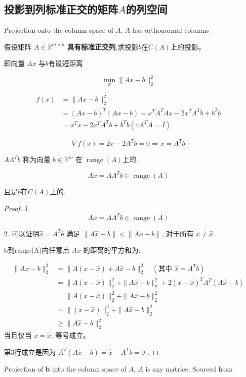 \subsection{投影到列标准正交的矩阵$A$的列空间}
\label{chap:projection-onto-a}


\begin{FigureCenter}{Projection onto the column space of $A$, $A$ has orthonormal columns}
    

\end{FigureCenter}


\begin{problem}
    假设矩阵 $ A \in \mathbb{R}^{m \times n} $ \textbf{具有标准正交列},求投影$b$在$C(A)$上的投影。
\end{problem}

即向量 $ A x $ 与$b$有最短距离

$$
\min _{x}\|A x-b\|_{2}^{2}
$$

$$ \begin{aligned} f(x) &=\|A x-b\|_{2}^{2}
    \\ & =(A x-b)^{T}(A x-b)=x^{T} A^{T} A x-2 x^{T} A^{T} b+b^{T} b \\ &=x^{T} x-2 x^{T} A^{T} b+b^{T} b\left(\because A^{T} A=I\right) \end{aligned} $$

$$ \nabla f(x)=2 x-2 A^{T} b=0 \Rightarrow x=A^{T} b $$

$ A A^{T} b $ 称为向量 $  {b} \in \mathbb{R}^{m} $ 在 $ \operatorname{range} (A)$上的.

\begin{theorem}
    $$ A x=A A^{T} b \in \operatorname{range}(A) $$

    且是$b$在$C(A)$上的.
\end{theorem}

\begin{proof}
    1.
    $$ A x=A A^{T} b \in \operatorname{range}(A) $$

    2. 可以证明$ \hat{x}=A^{T} b $ 满足 $ \|A \hat{x}-b\|<\|A x-b\| $, 对于所有 $ x \neq \hat{x} $.

    b到range(A)内任意点 $ A x $ 的距离的平方和为:

    $$ \begin{aligned}\|A x-b\|_{2}^{2} &=\|A(x-\hat{x})+A \hat{x}-b\|_{2}^{2} \quad\left(\text {其中 } \hat{x}=A^{T} b\right) \\ &=\|A(x-\hat{x})\|_{2}^{2}+\|A \hat{x}-b\|_{2}^{2}+2(x-\hat{x})^{T} A^{T}(A \hat{x}-b) \\ &=\|A(x-\hat{x})\|_{2}^{2}+\|A \hat{x}-b\|_{2}^{2} \\ &=\|(x-\hat{x})\|_{2}^{2}+\|A \hat{x}-b\|_{2}^{2} \\ & \geq\|A \hat{x}-b\|_{2}^{2} \end{aligned} $$
当且仅当 $ x=\hat{x} $, 等号成立。

第3行成立是因为 $ A^{T}(A \hat{x}-b)=\hat{x}-A^{T} b=0 $ .
\end{proof}

\begin{FigureCenter}{Projection of $\boldsymbol{b}$ into the column space of ${A}$, $A$ is any matrice. Sourced from \cite{Strang1993IntroductionTL}}
    
\end{FigureCenter}


    

